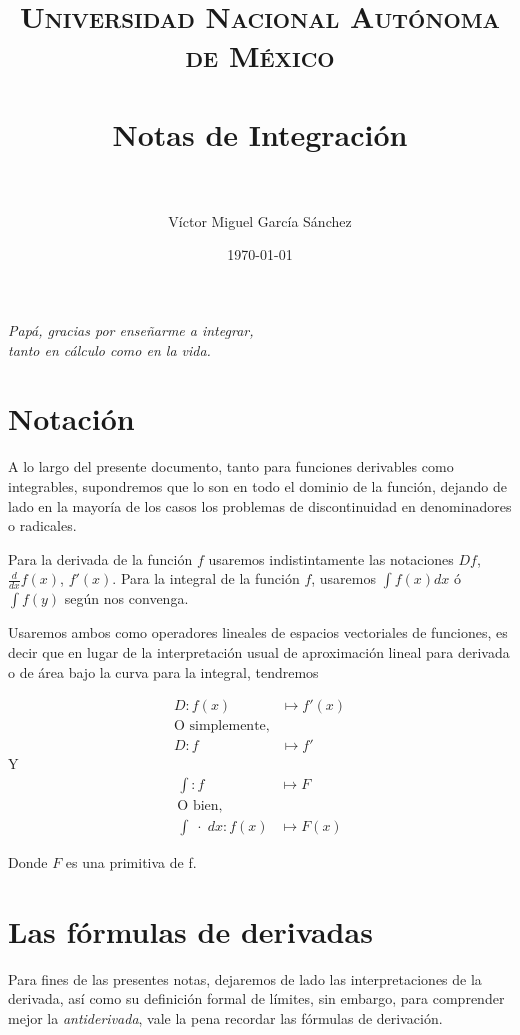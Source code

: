 \documentclass[paper=a4, fontsize=11pt]{scrartcl}
\title{
\normalfont\normalsize
\textsc{Universidad Nacional Autónoma de México} \\[25pt]
\horrule{0.5pt} \\[0.4cm]
\huge Notas de Integración\\[25pt]
\horrule{2pt} \\[0.5cm]
}
\author{Víctor Miguel García Sánchez}
\date{\normalsize\today}
\numberwithin{equation}{subsection}
\numberwithin{figure}{subsection}
\numberwithin{table}{subsection}
\theoremstyle{definition}
\begin{document}
\begin{flushright}%
  \emph{Papá, gracias por enseñarme a integrar,\\tanto en cálculo como en la vida.}
  \thispagestyle{empty}
\end{flushright}
\maketitle
\section*{Notación}
A lo largo del presente documento, tanto para funciones derivables como integrables, supondremos que lo son en todo el dominio de la función, dejando de lado en la mayoría de los casos los problemas de discontinuidad en denominadores o radicales.

Para la derivada de la función $f$ usaremos indistintamente las notaciones $Df$, $\frac{d}{dx}f(x)$, $f'(x)$. Para la integral de la función $f$, usaremos $\int f(x) dx$ ó $\int f(y)$ según nos convenga.

Usaremos ambos como operadores lineales de espacios vectoriales de funciones, es decir que en lugar de la interpretación usual de aproximación lineal para derivada o de área bajo la curva para la integral, tendremos

\begin{align*}
D:f(x)&\mapsto f'(x)\\
\text{O simplemente,}\\
D:f&\mapsto f'
\end{align*}
Y
\begin{align*}
\int:f&\mapsto F\\
\text{O bien,}\\
\int\;\cdot\; dx:f(x)&\mapsto F(x)
\end{align*}

Donde $F$ es una primitiva de f.

\newpage
\section{Las fórmulas de derivadas}

Para fines de las presentes notas, dejaremos de lado las interpretaciones de la derivada, así como su definición formal de límites, sin embargo, para comprender mejor la \textsl{antiderivada}, vale la pena recordar las fórmulas de derivación.
\end{document}
